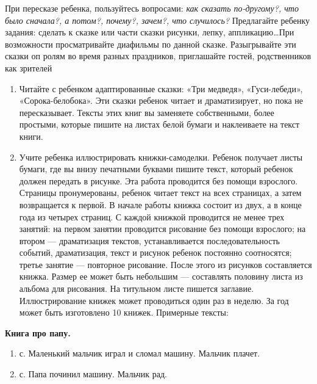 \documentclass{book}
\renewcommand{\emph}[1]{\textit{#1}}
\begin{document}
При пересказе ребенка, пользуйтесь вопросами: \emph{как сказать
по-другому?, что было сначала?, а потом?, почему?, зачем?, что
случилось?} Предлагайте ребенку задания: сделать к сказке или части
сказки рисунки, лепку, аппликацию\ldots При возможности просматривайте
диафильмы по данной сказке. Разыгрывайте эти сказки оп ролям во время
разных праздников, приглашайте гостей, родственников как зрителей


\begin{enumerate}
\def\labelenumi{\arabic{enumi}.}
\setcounter{enumi}{5}
\item
  
  Читайте с ребенком адаптированные сказки: «Три медведя»,
  «Гуси-лебеди», «Сорока-белобока». Эти сказки ребенок читает и
  драматизирует, но пока не пересказывает. Тексты этих книг вы заменяете
  собственными, более простыми, которые пишите на листах белой бумаги и
  наклеиваете на текст книги.
  
\item
  
  Учите ребенка иллюстрировать книжки-самоделки. Ребенок получает листы
  бумаги, где вы внизу печатными буквами пишите текст, который ребенок
  должен передать в рисунке. Эта работа проводится без помощи взрослого.
  Страницы пронумерованы, ребенок читает текст на всех страницах, а
  затем возвращается к первой. В начале работы книжка состоит из двух, а
  в конце года из четырех страниц. С каждой книжкой проводится не менее
  трех занятий: на первом занятии проводится рисование без помощи
  взрослого; на втором --- драматизация текстов, устанавливается
  последовательность событий, драматизация, текст и рисунок ребенок
  постоянно соотносятся; третье занятие --- повторное рисование. После
  этого из рисунков составляется книжка. Размер ее может быть небольшим
  --- составлять половину листа из альбома для рисования. На титульном
  листе пишется заглавие. Иллюстрирование книжек может проводиться один
  раз в неделю. За год может быть изготовлено 10 книжек. Примерные
  тексты:
  
\end{enumerate}


\textbf{Книга про папу.}


\begin{enumerate}
\def\labelenumi{\arabic{enumi}.}
\item
  
  с. Маленький мальчик играл и сломал машину. Мальчик плачет.
  
\item
  
  с. Папа починил машину. Мальчик рад.
  
\end{enumerate}
\end{document}
